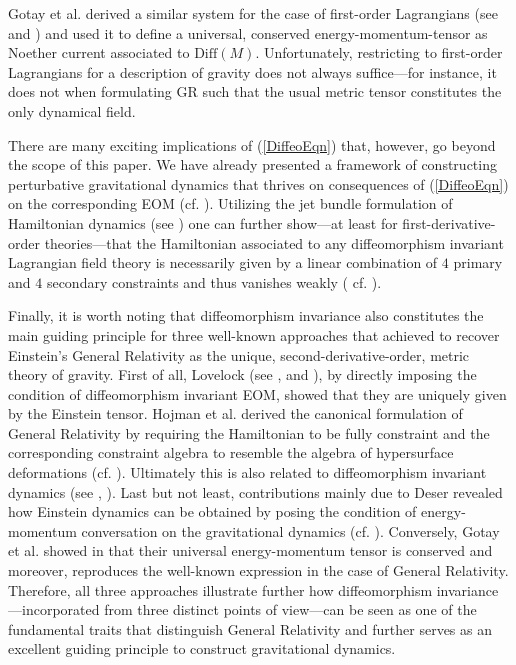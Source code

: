 \documentclass[%
preprint,
titlepage,
nofootinbib,
amsmath,amssymb,
showkeys,
aps,
prd,
floatfix,
]{revtex4-2}
\begin{document}
Gotay et al. derived a similar system for the case of first-order Lagrangians (see \cite{Gotay1992StressEnergyMomentumTA} and \cite{1998physics...1019G}) and used it to define a universal, conserved energy-momentum-tensor as Noether current associated to $\mathrm{Diff}(M)$. 
Unfortunately, restricting to first-order Lagrangians for a description of gravity does not always suffice---for instance, it does not when formulating GR such that the usual metric tensor constitutes the only dynamical field.

There are many exciting implications of (\ref{DiffeoEqn}) that, however, go beyond the scope of this paper. We have already presented a framework of constructing perturbative gravitational dynamics that thrives on consequences of (\ref{DiffeoEqn}) on the corresponding EOM (cf. \cite{TobiR}).
Utilizing the jet bundle formulation of Hamiltonian dynamics (see \cite{2004math.ph..11032G}) one can further show---at least for first-derivative-order theories---that the Hamiltonian associated to any diffeomorphism invariant Lagrangian field theory is necessarily given by a linear combination of $4$ primary and $4$ secondary constraints and thus vanishes weakly ( cf. \cite{TobiMaster}).

Finally, it is worth noting that diffeomorphism invariance also constitutes the main guiding principle for three well-known approaches that achieved to recover Einstein's General Relativity as the unique, second-derivative-order, metric theory of gravity. 
First of all, Lovelock (see \cite{Lovelock1969}, \cite{doi:10.1063/1.1665613} and \cite{doi:10.1063/1.1666069}), by directly imposing the condition of diffeomorphism invariant EOM, showed that they are uniquely given by the Einstein tensor.
Hojman et al. derived the canonical formulation of General Relativity by requiring the Hamiltonian to be fully constraint and the corresponding constraint algebra to resemble the algebra of hypersurface deformations (cf. \cite{HOJMAN197688}).
Ultimately this is also related to diffeomorphism invariant dynamics (see \cite{TobiMaster}, \cite{bojowald_2010}).
Last but not least, contributions mainly due to Deser revealed how Einstein dynamics can be obtained by posing the condition of energy-momentum conversation on the gravitational dynamics (cf. \cite{1970GReGr...1....9D}).
Conversely, Gotay et al. showed in \cite{Gotay1992StressEnergyMomentumTA} that their universal energy-momentum tensor is conserved and moreover, reproduces the well-known expression in the case of General Relativity.
Therefore, all three approaches illustrate further how diffeomorphism invariance---incorporated from three distinct points of view---can be seen as one of the fundamental traits that distinguish General Relativity and further serves as an excellent guiding principle to construct gravitational dynamics.
\end{document}
